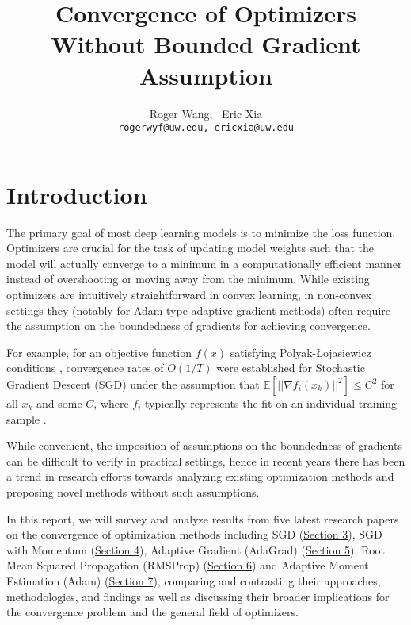 \documentclass{article}
\title{Convergence of Optimizers Without Bounded Gradient Assumption}
\author{%
  Roger Wang, \ Eric Xia \\
  \texttt{rogerwyf@uw.edu, ericxia@uw.edu} \\
}
\begin{document}
\maketitle


\section{Introduction}

The primary goal of most deep learning models is to minimize the loss function.
Optimizers are crucial for the task of updating model weights such that the model will actually converge to a minimum in a computationally efficient manner instead of overshooting or moving away from the minimum. While existing optimizers are intuitively straightforward in convex learning, in non-convex settings they (notably for Adam-type adaptive gradient methods)
often require the assumption on the boundedness of gradients for achieving convergence.

For example, for an objective function  $f(x)$ satisfying
Polyak-Łojasiewicz conditions \cite{POLYAK1963864},  convergence rates of $O(1/T)$ were established for Stochastic Gradient Descent (SGD) under the assumption that $\mathbb{E}[||\nabla f_i(x_k)||^2] \leq C^2$ for all $x_k$ and some $C$, where $f_i$ typically represents the fit on an individual training sample \cite{DBLP:journals/corr/KarimiNS16}.

While convenient, the imposition of assumptions on the boundedness of gradients can be difficult to verify in practical settings, hence in recent years there has been a trend in research efforts towards analyzing existing optimization methods and proposing novel methods without such assumptions. 

In this report, we will survey and analyze results from five latest research papers on the convergence of optimization methods including SGD (\hyperref[section3]{Section 3}), SGD with Momentum (\hyperref[section4]{Section 4}), Adaptive Gradient (AdaGrad) (\hyperref[section5]{Section 5}), Root Mean Squared Propagation (RMSProp) (\hyperref[section6]{Section 6}) and Adaptive Moment Estimation (Adam) (\hyperref[section7]{Section 7}), comparing and contrasting their approaches, methodologies, and findings as well as discussing their broader implications for the convergence problem and the general field of optimizers.
\end{document}
